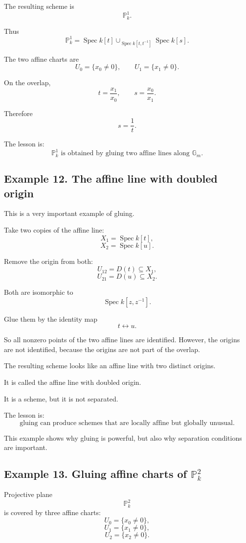\documentclass[12pt,a4paper]{article}
\newcommand{\Spec}{\operatorname{Spec}}
\theoremstyle{notespace}
\begin{document}
The resulting scheme is
\[
\mathbb P^1_k.
\]

Thus
\[
\boxed{
	\mathbb P^1_k
	=
	\Spec k[t]
	\cup_{\Spec k[t,t^{-1}]}
	\Spec k[s].
}
\]

The two affine charts are
\[
U_0=\{x_0\neq0\},
\qquad
U_1=\{x_1\neq0\}.
\]

On the overlap,
\[
t=\frac{x_1}{x_0},
\qquad
s=\frac{x_0}{x_1}.
\]

Therefore
\[
s=\frac1t.
\]

The lesson is:
\[
\boxed{
	\mathbb P^1_k
	\text{ is obtained by gluing two affine lines along }\mathbb G_m.
}
\]

\subsection{Example 12. The affine line with doubled origin}

This is a very important example of gluing.

Take two copies of the affine line:
\[
X_1=\Spec k[t],
\]
\[
X_2=\Spec k[u].
\]

Remove the origin from both:
\[
U_{12}=D(t)\subseteq X_1,
\]
\[
U_{21}=D(u)\subseteq X_2.
\]

Both are isomorphic to
\[
\Spec k[z,z^{-1}].
\]

Glue them by the identity map
\[
t\leftrightarrow u.
\]

So all nonzero points of the two affine lines are identified. However, the origins are not identified, because the origins are not part of the overlap.

The resulting scheme looks like an affine line with two distinct origins.

It is called the affine line with doubled origin.

It is a scheme, but it is not separated.

The lesson is:
\[
\boxed{
	\text{gluing can produce schemes that are locally affine but globally unusual.}
}
\]

This example shows why gluing is powerful, but also why separation conditions are important.

\subsection{Example 13. Gluing affine charts of \(\mathbb P^2_k\)}

Projective plane
\[
\mathbb P^2_k
\]
is covered by three affine charts:
\[
U_0=\{x_0\neq0\},
\]
\[
U_1=\{x_1\neq0\},
\]
\[
U_2=\{x_2\neq0\}.
\]
\end{document}
